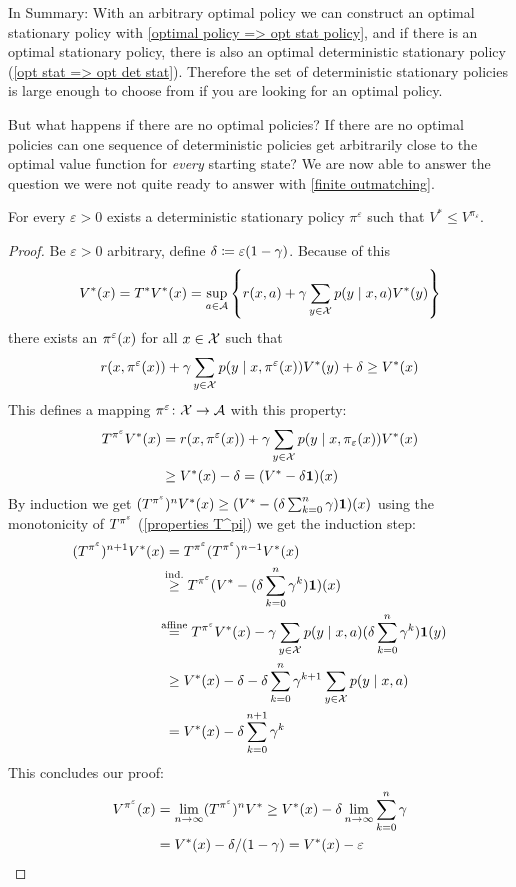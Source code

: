 In Summary: With an arbitrary optimal policy we can construct an optimal stationary policy with \ref{optimal policy => opt stat policy}, and if there is an optimal stationary policy, there is also an optimal deterministic stationary policy (\ref{opt stat => opt det stat}). Therefore the set of deterministic stationary policies is large enough to choose from if you are looking for an optimal policy. 

But what happens if there are no optimal policies? If there are no optimal policies can one sequence of deterministic policies get arbitrarily close to the optimal value function for \emph{every} starting state? We are now able to answer the question we were not quite ready to answer with \ref{finite outmatching}.

\begin{prop}
	For every \(\varepsilon>0\) exists a deterministic stationary policy \(\pi^\varepsilon\) such that \(V^* \le V^{\pi_\varepsilon} \).
\end{prop}
\begin{proof}
	Be \(\varepsilon>0 \) arbitrary,  define \(\delta\coloneqq \varepsilon (1-\gamma) \). Because of this
	\[
		V^*(x)=T^*V^*(x)=\sup_{a\in\mathcal{A}}
		\left\{r(x,a)+\gamma\sum_{y\in\mathcal{X}}p(y\mid x,a)V^*(y) \right\}
	\]
	there exists an \(\pi^\varepsilon(x)\) for all \(x\in\mathcal{X}\) such that
	\[
		r(x,\pi^\varepsilon(x))+\gamma\sum_{y\in\mathcal{X}}p(y\mid x,\pi^\varepsilon(x))V^*(y) + \delta \ge V^*(x)
	\]
	This defines a mapping \(\pi^\varepsilon\colon \mathcal{X}\to\mathcal{A}\) with this property:
	\begin{align*}
		T^{\pi^\varepsilon} V^*(x)
		&=r(x,\pi^\varepsilon(x))+\gamma \sum_{y\in\mathcal{X}}p(y\mid x,\pi_\varepsilon(x)) V^*(x)\\
		&\ge V^*(x) -\delta = (V^* -\delta \mathbf{1}) (x)
	\end{align*}
	By induction we get 
	\((T^{\pi^\varepsilon})^n V^*(x)\ge (V^*-(\delta\sum_{k=0}^n\gamma) \mathbf{1}) (x)\) using the monotonicity of \(T^{\pi^\varepsilon}\) (\ref{properties T^pi}) we get the induction step:
	\begin{align*}
		(T^{\pi^\vep})^{n+1} V^*(x)
		&=T^{\pi^\vep} (T^{\pi^\vep})^{n-1} V^*(x)\\
		&\lxgq{\text{ind.}} T^{\pi^\vep} (V^*-(\delta\sum_{k=0}^n\gamma^k) \mathbf{1})(x)\\
		&\lxeq{\text{affine}} T^{\pi^\vep} V^*(x) - \gamma \sum_{y\in\cX} p(y\mid x, a) (\delta\sum_{k=0}^n\gamma^k) \mathbf{1}(y)\\
		&\ge V^*(x)-\delta - \delta\sum_{k=0}^n\gamma^{k+1} \sum_{y\in\cX} p(y\mid x,a)\\
		&=V^*(x)-\delta \sum_{k=0}^{n+1}\gamma^k
	\end{align*}
	This concludes our proof:
	\begin{align*}
		V^{\pi^\varepsilon}(x)&=\lim_{n\to\infty} (T^{\pi^\varepsilon})^n V^* 
		\ge V^*(x)-\delta\lim_{n\to\infty}\sum_{k=0}^n\gamma\\
		&=V^*(x)-\delta/(1-\gamma)=V^*(x)-\varepsilon \qedhere
	\end{align*}
\end{proof}




\endinput